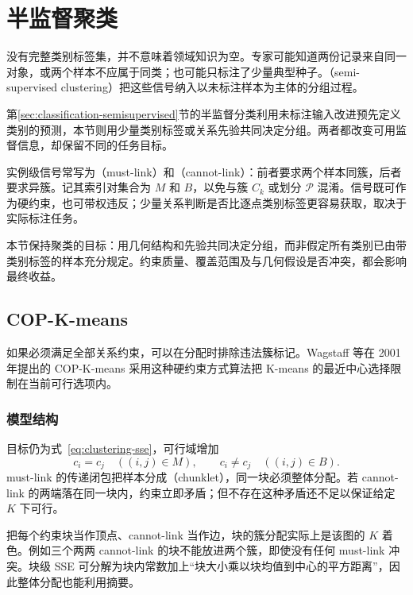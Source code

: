 \section{半监督聚类}
\label{sec:clustering-semisupervised}

没有完整类别标签集，并不意味着领域知识为空。专家可能知道两份记录来自同一对象，或两个样本不应属于同类；也可能只标注了少量典型种子。（semi-supervised clustering）把这些信号纳入以未标注样本为主体的分组过程。

第\ref{sec:classification-semisupervised}节的半监督分类利用未标注输入改进预先定义类别的预测，本节则用少量类别标签或关系先验共同决定分组。两者都改变可用监督信息，却保留不同的任务目标。

实例级信号常写为（must-link）和（cannot-link）：前者要求两个样本同簇，后者要求异簇。记其索引对集合为 $M$ 和 $B$，以免与簇 $C_k$ 或划分 $\mathcal{P}$ 混淆。信号既可作为硬约束，也可带权违反；少量关系判断是否比逐点类别标签更容易获取，取决于实际标注任务。

本节保持聚类的目标：用几何结构和先验共同决定分组，而非假定所有类别已由带类别标签的样本充分规定。约束质量、覆盖范围及与几何假设是否冲突，都会影响最终收益。

\subsection{COP-K-means}
\label{sec:clustering-cop}

如果必须满足全部关系约束，可以在分配时排除违法簇标记。Wagstaff 等在 2001 年提出的 COP-K-means 采用这种硬约束方式算法把 K-means 的最近中心选择限制在当前可行选项内。

\subsubsection{模型结构}

目标仍为式~\eqref{eq:clustering-sse}，可行域增加
\begin{equation}
 c_i=c_j\quad((i,j)\in M),\qquad
 c_i\ne c_j\quad((i,j)\in B).
 \label{eq:clustering-cop}
\end{equation}
must-link 的传递闭包把样本分成（chunklet），同一块必须整体分配。若 cannot-link 的两端落在同一块内，约束立即矛盾；但不存在这种矛盾还不足以保证给定 $K$ 下可行。

把每个约束块当作顶点、cannot-link 当作边，块的簇分配实际上是该图的 $K$ 着色。例如三个两两 cannot-link 的块不能放进两个簇，即使没有任何 must-link 冲突。块级 SSE 可分解为块内常数加上“块大小乘以块均值到中心的平方距离”，因此整体分配也能利用摘要。

